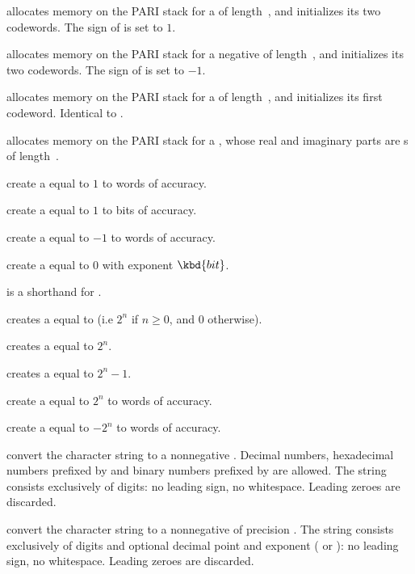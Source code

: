  allocates memory on the PARI stack for a
 of length~, and initializes its two codewords. The sign
of  is set to $1$.

 allocates memory on the PARI stack for a negative
 of length~, and initializes its two codewords. The sign
of  is set to $-1$.

 allocates memory on the PARI stack for a 
of length~, and initializes its first codeword. Identical to
.

 allocates memory on the PARI stack for a
, whose real and imaginary parts are s
of length~.

 create a  equal to $1$ to 
words of accuracy.

 create a  equal to $1$ to
 bits of accuracy.

 create a  equal to $-1$ to 
words of accuracy.

 create a  equal to $0$ with
exponent $\kbd{bit}$.

 is a shorthand for .

 creates a  equal to  (i.e
$2^n$ if $n \geq 0$, and $0$ otherwise).

 creates a  equal to $2^n$.

 creates a  equal to $2^n - 1$.

 create a  equal to $2^n$
to  words of accuracy.

 create a  equal to $-2^n$
to  words of accuracy.

 convert the character string  to a
nonnegative .
Decimal numbers, hexadecimal numbers prefixed by  and binary numbers prefixed
by  are allowed.  The string  consists exclusively of digits:
no leading sign, no whitespace. Leading zeroes are discarded.

 convert the character string  to
a nonnegative  of precision . The string 
consists exclusively of digits and optional decimal point and exponent
( or ): no leading sign, no whitespace. Leading zeroes are
discarded.


